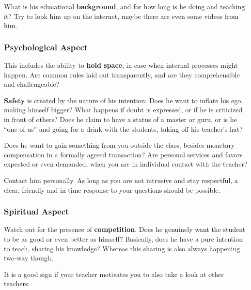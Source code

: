 What is his educational \textbf{background}, and for how long is he doing and teaching it?
Try to look him up on the internet, maybe there are even some videos from him.

\subsubsection{Psychological Aspect}\label{subsec:psychological-aspect}

This includes the ability to \textbf{hold space}, in case when internal processes might happen.
Are common rules laid out transparently, and are they comprehensible and challengeable?

\textbf{Safety} is created by the nature of his intention: Does he want to inflate his ego, making himself bigger?
What happens if doubt is expressed, or if he is criticized in front of others?
Does he claim to have a status of a master or guru, or is he ``one of us'' and going for a drink with the students, taking off his teacher's hat?

Does he want to gain something from you outside the class, besides monetary compensation in a formally agreed transaction?
Are personal services and favors expected or even demanded, when you are in individual contact with the teacher?

Contact him personally.
As long as you are not intrusive and stay respectful, a clear, friendly and in-time response to your questions should be possible.

\subsubsection{Spiritual Aspect}\label{subsec:spiritual-aspect}

Watch out for the presence of \textbf{competition}.
Does he genuinely want the student to be as good or even better as himself?
Basically, does he have a pure intention to teach, sharing his knowledge?
Whereas this sharing is also always happening two-way though,

It is a good sign if your teacher motivates you to also take a look at other teachers.
